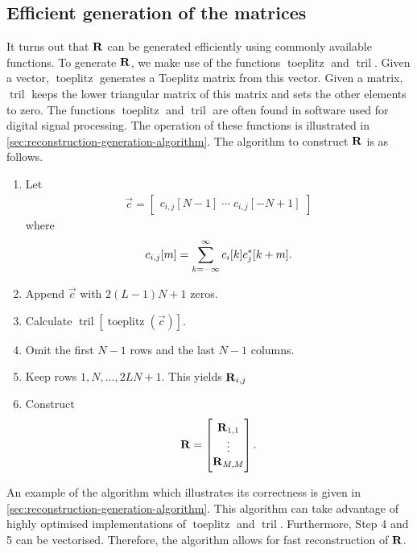 \documentclass[a4paper, openany, oneside]{memoir}
\begin{document}
\subsection{Efficient generation of the matrices}
\label{sub:reconstruction-generation}
It turns out that $\boldsymbol{\mathbf{R}}$ can be generated efficiently using commonly available functions. To generate $\boldsymbol{\mathbf{R}}$, we make use of the functions $\operatorname{toeplitz}$ and $\operatorname{tril}$. Given a vector, $\operatorname{toeplitz}$ generates a Toeplitz matrix from this vector. Given a matrix, $\operatorname{tril}$ keeps the lower triangular matrix of this matrix and sets the other elements to zero. The functions $\operatorname{toeplitz}$ and $\operatorname{tril}$ are often found in software used for digital signal processing. The operation of these functions is illustrated in \cref{sec:reconstruction-generation-algorithm}. The algorithm to construct $\boldsymbol{\mathbf{R}}$ is as follows.

\begin{enumerate}[labelindent=0pt,labelwidth=\widthof{\ref{last-item2}},label=Step \arabic*:,itemindent=1em,leftmargin=!]
    \item Let \begin{align*}
                \vec{c} = \begin{bmatrix} c_{i,j}[N-1] \; \cdots \; c_{i,j}[-N+1] \end{bmatrix}
\end{align*} where \begin{align*}
                c_{i,j}[m] = \sum_{k=-\infty}^{\infty}c_i[k] c^*_j[k+m].
            \end{align*}
    \item Append $\vec{c}$ with $2(L-1)N+1$ zeros. \\
    \item Calculate $\operatorname{tril}[\operatorname{toeplitz}(\vec{c})]$. \\
    \item Omit the first $N-1$ rows and the last $N-1$ columns. \\
    \item Keep rows $1,N,\ldots,2LN+1$. This yields $\boldsymbol{\mathbf{R}}_{i,j}$ \\
    \item Construct \begin{align*}
        \boldsymbol{\mathbf{R}} = \begin{bmatrix}
            \boldsymbol{\mathbf{R}}_{1,1} \\ \vdots \\ \boldsymbol{\mathbf{R}}_{M,M}
        \end{bmatrix}.
    \end{align*}
    \label{last-item2}
\end{enumerate}

An example of the algorithm which illustrates its correctness is given in \cref{sec:reconstruction-generation-algorithm}. This algorithm can take advantage of highly optimised implementations of $\operatorname{toeplitz}$ and $\operatorname{tril}$. Furthermore, Step 4 and 5 can be vectorised. Therefore, the algorithm allows for fast reconstruction of $\boldsymbol{\mathbf{R}}$.
\end{document}
